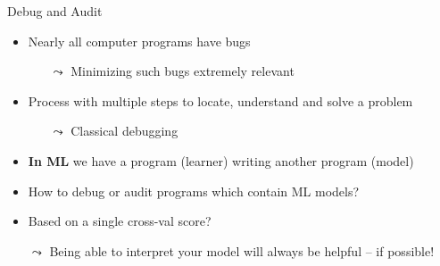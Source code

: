 \documentclass[11pt,compress,t,notes=noshow, aspectratio=169, xcolor=table]{beamer}
\begin{document}
\begin{frame}{Debug and Audit}
    \begin{itemize}
        \item Nearly all computer programs have bugs
        \begin{itemize}
            \item[$\leadsto$] Minimizing such bugs extremely relevant
        \end{itemize}
        \item Process with multiple steps to locate, understand and solve a problem
        \begin{itemize}
            \item[$\leadsto$] Classical debugging
        \end{itemize}
        \item \textbf{In ML} we have a program (learner) writing another program (model)
        \item How to debug or audit programs which contain ML models? 
        \item Based on a single cross-val score?
            \item[$\leadsto$] Being able to interpret your model will always be helpful -- if possible!
    \end{itemize}
\end{frame}



\end{document}

